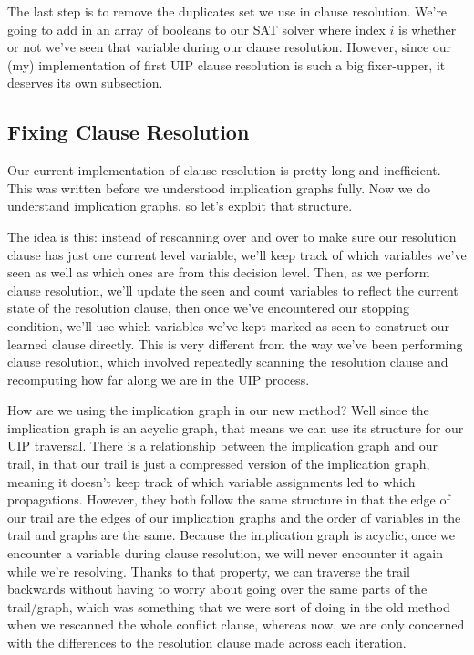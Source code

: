 The last step is to remove the duplicates set we use in clause resolution.
We're going to add in an array of booleans to our SAT solver where index $i$ 
is whether or not we've seen that variable during our clause resolution.
However, since our (my) implementation of first UIP clause resolution is 
such a big fixer-upper, it deserves its own subsection.

\subsection{Fixing Clause Resolution}

Our current implementation of clause resolution is pretty long and inefficient. This was 
written before we understood implication graphs fully. Now we do understand implication graphs, 
so let's exploit that structure.

The idea is this: instead of rescanning over and over to make sure our resolution clause
has just one current level variable, we'll keep track of which variables we've seen as 
well as which ones are from this decision level. Then, as we perform clause resolution, 
we'll update the seen and count variables to reflect the current state of the resolution 
clause, then once we've encountered our stopping condition, we'll use which variables 
we've kept marked as seen to construct our learned clause directly. This is very different 
from the way we've been performing clause resolution, which involved repeatedly scanning the 
resolution clause and recomputing how far along we are in the UIP process. 

How are we using the implication graph in our new method? Well since the implication 
graph is an acyclic graph, that means we can use its structure for our UIP traversal. 
There is a relationship between the implication graph and our trail, in that our trail 
is just a compressed version of the implication graph, meaning it doesn't keep track of 
which variable assignments led to which propagations. However, they both follow the same 
structure in that the edge of our trail are the edges of our implication graphs and the 
order of variables in the trail and graphs are the same. Because the implication graph 
is acyclic, once we encounter a variable during clause resolution, we will never encounter 
it again while we're resolving. Thanks to that property, we can traverse the trail backwards 
without having to worry about going over the same parts of the trail/graph, which was 
something that we were sort of doing in the old method when we rescanned the whole 
conflict clause, whereas now, we are only concerned with the differences to the resolution
clause made across each iteration. 

